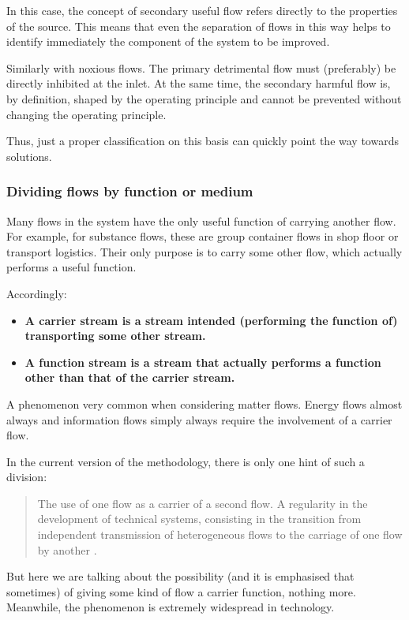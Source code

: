 \documentclass[a4paper,11pt]{article}
\begin{document}
In this case, the concept of secondary useful flow refers directly to the
properties of the source. This means that even the separation of flows in this
way helps to identify immediately the component of the system to be improved.

Similarly with noxious flows. The primary detrimental flow must (preferably)
be directly inhibited at the inlet. At the same time, the secondary harmful
flow is, by definition, shaped by the operating principle and cannot be
prevented without changing the operating principle.

Thus, just a proper classification on this basis can quickly point the way
towards solutions.

\subsubsection{Dividing flows by function or medium}

Many flows in the system have the only useful function of carrying another
flow. For example, for substance flows, these are group container flows in
shop floor or transport logistics. Their only purpose is to carry some other
flow, which actually performs a useful function.

Accordingly:
\begin{itemize}
\item \textbf{A carrier stream is a stream intended (performing the function
  of) transporting some other stream.}
\item \textbf{A function stream is a stream that actually performs a function
  other than that of the carrier stream.}
\end{itemize}
A phenomenon very common when considering matter flows. Energy flows almost
always and information flows simply always require the involvement of a
carrier flow.

In the current version of the methodology, there is only one hint of such a
division:
\begin{quote}
  The use of one flow as a carrier of a second flow. A regularity in the
  development of technical systems, consisting in the transition from
  independent transmission of heterogeneous flows to the carriage of one flow
  by another \cite{B6}.
\end{quote}

But here we are talking about the possibility (and it is emphasised that
sometimes) of giving some kind of flow a carrier function, nothing more.
Meanwhile, the phenomenon is extremely widespread in technology.
\end{document}
